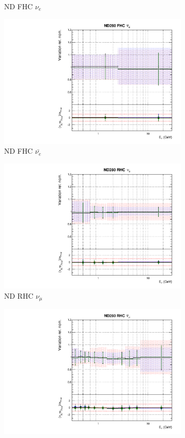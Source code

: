 \begin{figure}[!htbp]
\begin{subfigure}{0.45\textwidth}
  \caption{ND FHC $\nu_{e}$}
\end{subfigure}
\begin{subfigure}{0.45\textwidth}
  \centering
  \includegraphics[width=0.75\linewidth]{figs/polyasmvsflux_3}
  \caption{ND FHC $\bar{\nu_{e}}$}
\end{subfigure}
\begin{subfigure}{0.45\textwidth}
  \centering
  \includegraphics[width=0.75\linewidth]{figs/polyasmvsflux_4}
  \caption{ND RHC $\nu_{\mu}$}
\end{subfigure}
\begin{subfigure}{0.45\textwidth}
  \centering
  \includegraphics[width=0.75\linewidth]{figs/polyasmvsflux_5}

\end{subfigure}
\end{figure}
